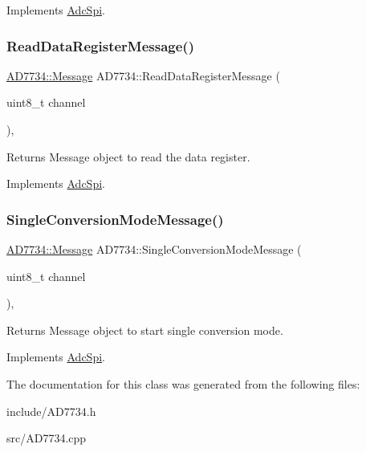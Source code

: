 Implements \mbox{\hyperlink{classAdcSpi_aa9970471c6fc505e4b91ac6985ac1489}{Adc\+Spi}}.

\mbox{\label{classAD7734_a2bfd6161eedac320b5b77beb6f209517}} 
\subsubsection{\texorpdfstring{Read\+Data\+Register\+Message()}{ReadDataRegisterMessage()}}
{\footnotesize\ttfamily \mbox{\hyperlink{structAdcSpi_1_1Message}{A\+D7734\+::\+Message}} A\+D7734\+::\+Read\+Data\+Register\+Message (\begin{DoxyParamCaption}\item[{uint8\+\_\+t}]{channel }\end{DoxyParamCaption})\hspace{0.3cm}{\ttfamily [protected]}, {\ttfamily [virtual]}}

Returns Message object to read the data register. 

Implements \mbox{\hyperlink{classAdcSpi_acd92eec341ed010e5b7569ffcbba811d}{Adc\+Spi}}.

\mbox{\label{classAD7734_a6ac58d1c41ad0562329a932d464bfce1}} 
\subsubsection{\texorpdfstring{Single\+Conversion\+Mode\+Message()}{SingleConversionModeMessage()}}
{\footnotesize\ttfamily \mbox{\hyperlink{structAdcSpi_1_1Message}{A\+D7734\+::\+Message}} A\+D7734\+::\+Single\+Conversion\+Mode\+Message (\begin{DoxyParamCaption}\item[{uint8\+\_\+t}]{channel }\end{DoxyParamCaption})\hspace{0.3cm}{\ttfamily [protected]}, {\ttfamily [virtual]}}

Returns Message object to start single conversion mode. 

Implements \mbox{\hyperlink{classAdcSpi_ac6a6421e3045c986c6997019a04d11ea}{Adc\+Spi}}.



The documentation for this class was generated from the following files\+:\begin{DoxyCompactItemize}
\item 
include/A\+D7734.\+h\item 
src/A\+D7734.\+cpp\end{DoxyCompactItemize}
